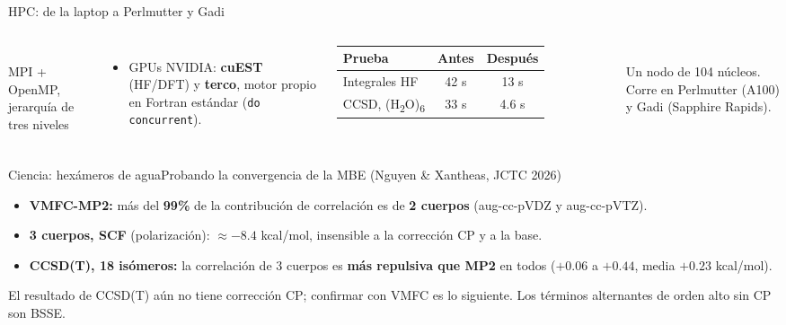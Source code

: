 \documentclass[aspectratio=169]{beamer}
\newcommand{\cplx}[1]{{\footnotesize\color{cookieMuted}#1}}
\newcommand{\src}[1]{{\tiny\color{cookieMuted}#1}}
\begin{document}
\begin{frame}{HPC: de la laptop a Perlmutter y Gadi}
  \begin{columns}[T,onlytextwidth]
      \centering
      \\
      \src{MPI + OpenMP, jerarquía de tres niveles}
      \begin{itemize}\setlength\itemsep{2pt}\small
        \item GPUs NVIDIA: \textbf{cuEST} (HF/DFT) y \textbf{terco}, motor propio en Fortran estándar (\texttt{do concurrent}).
      \end{itemize}
      \centering
      \begin{tabular}{lcc}
        \toprule
        \textbf{Prueba} & \textbf{Antes} & \textbf{Después}\\
        \midrule
        Integrales HF & 42 s & 13 s\\
        CCSD, (H\textsubscript{2}O)\textsubscript{6} & 33 s & 4.6 s\\
        \bottomrule
      \end{tabular}\\[.4em]
      \cplx{Un nodo de 104 núcleos. Corre en Perlmutter (A100) y Gadi (Sapphire Rapids).}
  \end{columns}
\end{frame}

\begin{frame}{Ciencia: hexámeros de agua}{Probando la convergencia de la MBE (Nguyen \& Xantheas, JCTC 2026)}
  \begin{itemize}\setlength\itemsep{6pt}
    \item \textbf{VMFC-MP2:} más del \textbf{99\%} de la contribución de correlación es de \textbf{2 cuerpos} (aug-cc-pVDZ y aug-cc-pVTZ).
    \item \textbf{3 cuerpos, SCF} (polarización): $\approx -8.4$ kcal/mol, insensible a la corrección CP y a la base.
    \item \textbf{CCSD(T), 18 isómeros:} la correlación de 3 cuerpos es \textbf{más repulsiva que MP2} en todos ($+0.06$ a $+0.44$, media $+0.23$ kcal/mol).
  \end{itemize}
  \cplx{El resultado de CCSD(T) aún no tiene corrección CP; confirmar con VMFC es lo siguiente. Los términos alternantes de orden alto sin CP son BSSE.}
\end{frame}
\end{document}
